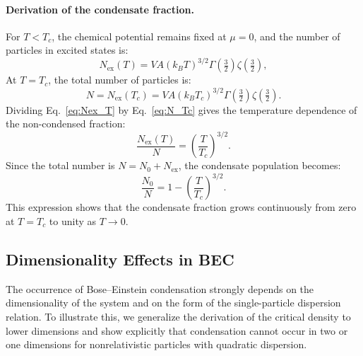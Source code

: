 \paragraph{Derivation of the condensate fraction.}
For \( T < T_c \), the chemical potential remains fixed at \( \mu = 0 \), and the number of particles in excited states is:
\begin{equation}
    N_{\mathrm{ex}}(T) = V A (k_B T)^{3/2}
    \Gamma\!\left(\tfrac{3}{2}\right)
    \zeta\!\left(\tfrac{3}{2}\right),
    \label{eq:Nex_T}
\end{equation}
At \( T = T_c \), the total number of particles is:
\begin{equation}
    N = N_{\mathrm{ex}}(T_c)
      = V A (k_B T_c)^{3/2}
        \Gamma\!\left(\tfrac{3}{2}\right)
        \zeta\!\left(\tfrac{3}{2}\right).
    \label{eq:N_Tc}
\end{equation}
Dividing Eq.~\eqref{eq:Nex_T} by Eq.~\eqref{eq:N_Tc} gives the temperature dependence of the non-condensed fraction:
\[
    \frac{N_{\mathrm{ex}}(T)}{N}
    = \left(\frac{T}{T_c}\right)^{3/2}.
    \label{eq:Nex_fraction}
\]
Since the total number is \( N = N_0 + N_{\mathrm{ex}} \), the condensate population becomes:
\begin{equation}
\boxed{
    \frac{N_0}{N}
    = 1 - \left(\frac{T}{T_c}\right)^{3/2}.
    }
    \label{eq:condensate_fraction}
\end{equation}
This expression shows that the condensate fraction grows continuously from zero at \( T = T_c \) to unity as \( T \to 0 \).


\subsection*{Dimensionality Effects in BEC}
\label{Dimension_BEC}
The occurrence of Bose--Einstein condensation strongly depends on the dimensionality of the system and on the form of the single-particle dispersion relation.  
To illustrate this, we generalize the derivation of the critical density to lower dimensions and show explicitly that condensation cannot occur in two or one dimensions for nonrelativistic particles with quadratic dispersion.

